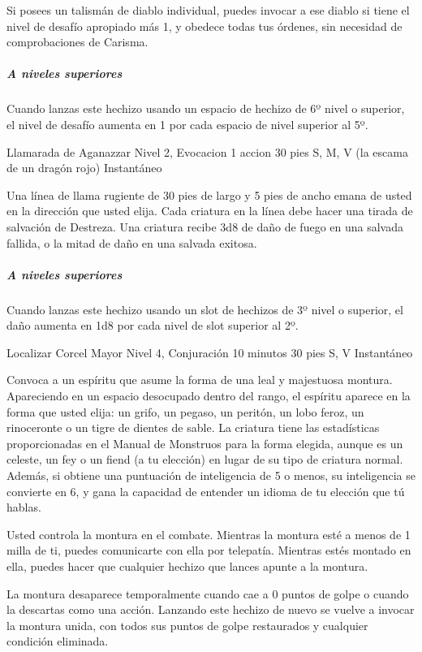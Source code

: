 \documentclass[a4paper,twocolumn,openany,10pt]{dndbook}
\begin{document}
	Si posees un talismán de diablo individual, puedes invocar a ese diablo si tiene el nivel de desafío apropiado más 1, y
	obedece todas tus órdenes, sin necesidad de comprobaciones de Carisma.

	\subparagraph{A niveles superiores} Cuando lanzas este hechizo usando un espacio de hechizo de 6º nivel o superior, el nivel
	de desafío aumenta en 1 por cada espacio de nivel superior al 5º. 

\spellheader%
	{Llamarada de Aganazzar}
	{Nivel 2, Evocacion}
	{1 accion}
	{30 pies}
	{S, M, V (la escama de un dragón rojo)}
	{Instantáneo}
	
	Una línea de llama rugiente de 30 pies de largo y 5 pies de ancho emana de usted en la dirección que usted elija. Cada
	criatura en la línea debe hacer una tirada de salvación de Destreza. Una criatura recibe 3d8 de daño de fuego en una salvada
	fallida, o la mitad de daño en una salvada exitosa.

	\subparagraph{A niveles superiores} Cuando lanzas este hechizo usando un slot de hechizos de 3º nivel o superior, el daño
	aumenta en 1d8 por cada nivel de slot superior al 2º. 

\spellheader%
	{Localizar Corcel Mayor}
	{Nivel 4, Conjuración}
	{10 minutos}
	{30 pies}
	{S, V}
	{Instantáneo}
	
	Convoca a un espíritu que asume la forma de una leal y majestuosa montura. Apareciendo en un espacio desocupado dentro del
	rango, el espíritu aparece en la forma que usted elija: un grifo, un pegaso, un peritón, un lobo feroz, un rinoceronte o un
	tigre de dientes de sable. La criatura tiene las estadísticas proporcionadas en el Manual de Monstruos para la forma elegida,
	aunque es un celeste, un fey o un fiend (a tu elección) en lugar de su tipo de criatura normal. Además, si obtiene una
	puntuación de inteligencia de 5 o menos, su inteligencia se convierte en 6, y gana la capacidad de entender un idioma de tu
	elección que tú hablas.
	
	Usted controla la montura en el combate. Mientras la montura esté a menos de 1 milla de ti, puedes comunicarte con ella por
	telepatía. Mientras estés montado en ella, puedes hacer que cualquier hechizo que lances apunte a la montura.
	
	La montura desaparece temporalmente cuando cae a 0 puntos de golpe o cuando la descartas como una acción. Lanzando este
	hechizo de nuevo se vuelve a invocar la montura unida, con todos sus puntos de golpe restaurados y cualquier condición
	eliminada.
	
\end{document}

